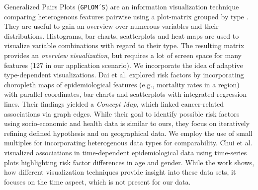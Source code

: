 \documentclass[journal]{style/vgtc} 			          %
\newcommand{\add}[1]{\textcolor{blue}{\uline{#1}}}
\begin{document}
Generalized Pairs Plots (\texttt{GPLOM´S}) are an information visualization technique comparing heterogenous features pairwise using a plot-matrix grouped by type \cite{GPLOMS, Francois2013}.
%
They are useful to gain an overview over numerous variables and their distributions.
%
Histograms, bar charts, scatterplots and heat maps are used to visualize variable combinations with regard to their type.
%
The resulting matrix provides an \emph{overview visualization}, but requires a lot of screen space for many features (127 in our application scenario).
%
%
%
We incorporate the idea of adaptive type-dependent visualizations.
%
Dai et al. \cite{Dai2005} explored risk factors by incorporating choropleth maps of epidemiological features (e.g., mortality rates in a region) with parallel coordinates, bar charts and scatterplots with integrated regression lines.
%
Their findings yielded a \emph{Concept Map}, which linked cancer-related associations via graph edges.
%
While their goal to identify possible risk factors using socio-economic and health data is similar to ours, they focus on iteratively refining defined hypothesis and on geographical data.
%
We employ the use of small multiples for incorporating heterogenous data types for comparability.
%
Chui et al. \cite{Chui2011} visualized associations in time-dependent epidemiological data using time-series plots highlighting risk factor differences in age and gender.
%
While the work shows, how different visualization techniques provide insight into these data sets, it focuses on the time aspect, which is not present for our data.
%
\end{document}
